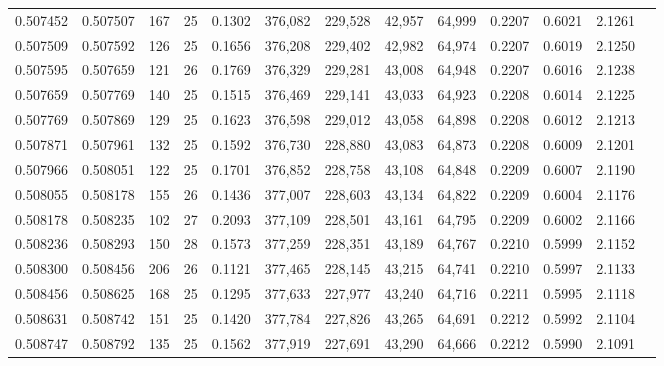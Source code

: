 \begin{tabular}{rrrrrrrrrrrrr}
0.507452 & 0.507507 & 167 &  25 &                                     0.1302 & 376,082 & 229,528 &  42,957 &  64,999 & 0.2207 & 0.6021 & 2.1261 \\
0.507509 & 0.507592 & 126 &  25 &                                     0.1656 & 376,208 & 229,402 &  42,982 &  64,974 & 0.2207 & 0.6019 & 2.1250 \\
0.507595 & 0.507659 & 121 &  26 &                                     0.1769 & 376,329 & 229,281 &  43,008 &  64,948 & 0.2207 & 0.6016 & 2.1238 \\
0.507659 & 0.507769 & 140 &  25 &                                     0.1515 & 376,469 & 229,141 &  43,033 &  64,923 & 0.2208 & 0.6014 & 2.1225 \\
0.507769 & 0.507869 & 129 &  25 &                                     0.1623 & 376,598 & 229,012 &  43,058 &  64,898 & 0.2208 & 0.6012 & 2.1213 \\
0.507871 & 0.507961 & 132 &  25 &                                     0.1592 & 376,730 & 228,880 &  43,083 &  64,873 & 0.2208 & 0.6009 & 2.1201 \\
0.507966 & 0.508051 & 122 &  25 &                                     0.1701 & 376,852 & 228,758 &  43,108 &  64,848 & 0.2209 & 0.6007 & 2.1190 \\
0.508055 & 0.508178 & 155 &  26 &                                     0.1436 & 377,007 & 228,603 &  43,134 &  64,822 & 0.2209 & 0.6004 & 2.1176 \\
0.508178 & 0.508235 & 102 &  27 &                                     0.2093 & 377,109 & 228,501 &  43,161 &  64,795 & 0.2209 & 0.6002 & 2.1166 \\
0.508236 & 0.508293 & 150 &  28 &                                     0.1573 & 377,259 & 228,351 &  43,189 &  64,767 & 0.2210 & 0.5999 & 2.1152 \\
0.508300 & 0.508456 & 206 &  26 &                                     0.1121 & 377,465 & 228,145 &  43,215 &  64,741 & 0.2210 & 0.5997 & 2.1133 \\
0.508456 & 0.508625 & 168 &  25 &                                     0.1295 & 377,633 & 227,977 &  43,240 &  64,716 & 0.2211 & 0.5995 & 2.1118 \\
0.508631 & 0.508742 & 151 &  25 &                                     0.1420 & 377,784 & 227,826 &  43,265 &  64,691 & 0.2212 & 0.5992 & 2.1104 \\
0.508747 & 0.508792 & 135 &  25 &                                     0.1562 & 377,919 & 227,691 &  43,290 &  64,666 & 0.2212 & 0.5990 & 2.1091 \\

\end{tabular}

